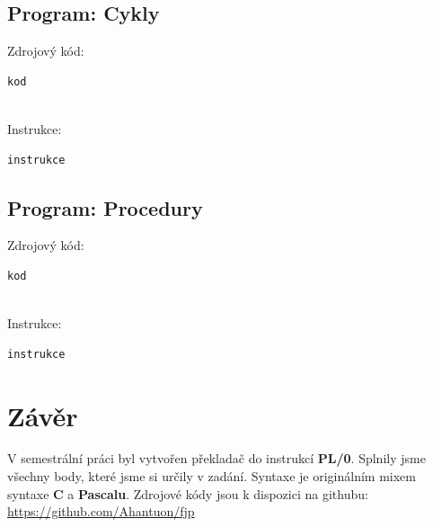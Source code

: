 \documentclass[12pt]{report}
\begin{document}
\section{Program: Cykly}
Zdrojový kód:
\begin{verbatim}
kod
\end{verbatim}
\ \\
Instrukce:
\begin{verbatim}
instrukce
\end{verbatim}


\section{Program: Procedury}
Zdrojový kód:
\begin{verbatim}
kod

\end{verbatim}
\ \\
Instrukce:
\begin{verbatim}
instrukce

\end{verbatim}


\chapter{Závěr}
V semestrální práci byl vytvořen překladač do instrukcí \textbf{PL/0}. Splnily jsme všechny body, které jsme si určily v zadání.
Syntaxe je originálním mixem syntaxe \textbf{C} a \textbf{Pascalu}.
Zdrojové kódy jsou k dispozici na githubu: \url{https://github.com/Ahantuon/fjp} 
\end{document}
